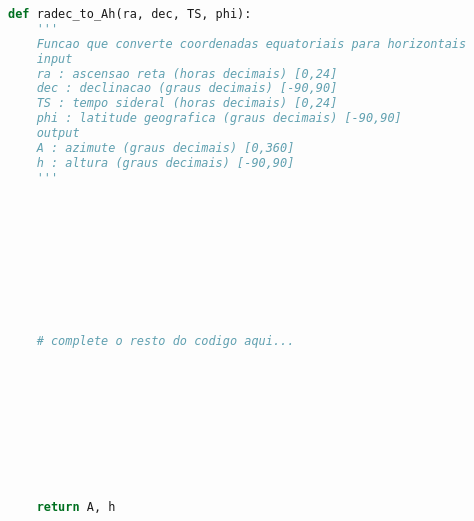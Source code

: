\begin{lstlisting}[language=Python]
def radec_to_Ah(ra, dec, TS, phi):
    '''
    Funcao que converte coordenadas equatoriais para horizontais
    input
    ra : ascensao reta (horas decimais) [0,24]
    dec : declinacao (graus decimais) [-90,90]
    TS : tempo sideral (horas decimais) [0,24]
    phi : latitude geografica (graus decimais) [-90,90]
    output
    A : azimute (graus decimais) [0,360]
    h : altura (graus decimais) [-90,90]
    '''
    
    
    
    
    
    
    
    
    
    
    # complete o resto do codigo aqui...

    
    
    
    
    
    
    
    
    
    return A, h
\end{lstlisting}

